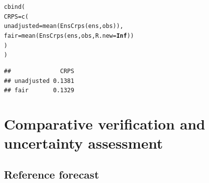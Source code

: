 \documentclass[10pt]{article}\usepackage[]{graphicx}\usepackage[]{color}
\makeatletter
\newcommand{\hlnum}[1]{\textcolor[rgb]{0.502,0,0.502}{\textbf{#1}}}%
\newcommand{\hlstd}[1]{\textcolor[rgb]{0,0,0}{#1}}%
\newcommand{\hlkwc}[1]{\textcolor[rgb]{0,0.502,0.753}{#1}}%
\newcommand{\hlkwd}[1]{\textcolor[rgb]{0,0.267,0.4}{#1}}%
\newenvironment{kframe}{%
 \def\at@end@of@kframe{}%
 \ifinner\ifhmode%
  \def\at@end@of@kframe{\end{minipage}}%
  \begin{minipage}{\columnwidth}%
 \fi\fi%
 \def\FrameCommand##1{\hskip\@totalleftmargin \hskip-\fboxsep
 \colorbox{shadecolor}{##1}\hskip-\fboxsep
     \hskip-\linewidth \hskip-\@totalleftmargin \hskip\columnwidth}%
 \MakeFramed {\advance\hsize-\width
   \@totalleftmargin\z@ \linewidth\hsize
   \@setminipage}}%
 {\par\unskip\endMakeFramed%
 \at@end@of@kframe}
\newenvironment{knitrout}{}{} %
\makeatother
\begin{document}
\begin{knitrout}
\color{fgcolor}\begin{kframe}
\begin{alltt}
\hlkwd{cbind}\hlstd{(}
 \hlkwc{CRPS}\hlstd{=}\hlkwd{c}\hlstd{(}
  \hlkwc{unadjusted} \hlstd{=} \hlkwd{mean}\hlstd{(}\hlkwd{EnsCrps}\hlstd{(ens, obs)),}
  \hlkwc{fair}       \hlstd{=} \hlkwd{mean}\hlstd{(}\hlkwd{EnsCrps}\hlstd{(ens, obs,} \hlkwc{R.new}\hlstd{=}\hlnum{Inf}\hlstd{))}
 \hlstd{)}
\hlstd{)}
\end{alltt}
\begin{verbatim}
##              CRPS
## unadjusted 0.1381
## fair       0.1329
\end{verbatim}
\end{kframe}
\end{knitrout}



\section{Comparative verification and uncertainty assessment}


\subsection{Reference forecast}
\end{document}
